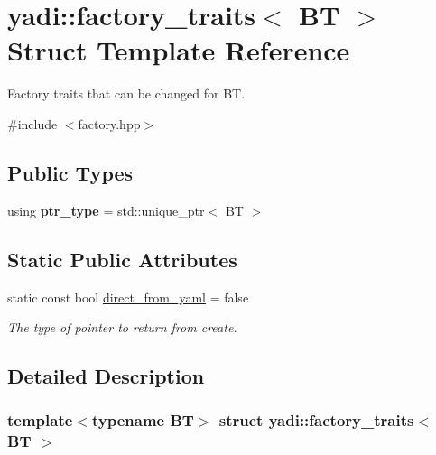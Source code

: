 \hypertarget{structyadi_1_1factory__traits}{}\section{yadi\+:\+:factory\+\_\+traits$<$ BT $>$ Struct Template Reference}
\label{structyadi_1_1factory__traits}


Factory traits that can be changed for BT.  




{\ttfamily \#include $<$factory.\+hpp$>$}

\subsection*{Public Types}
\begin{DoxyCompactItemize}
\item 
\mbox{\label{structyadi_1_1factory__traits_a9a3b539941324b3aef58464863c76b55}} 
using {\bfseries ptr\+\_\+type} = std\+::unique\+\_\+ptr$<$ BT $>$
\end{DoxyCompactItemize}
\subsection*{Static Public Attributes}
\begin{DoxyCompactItemize}
\item 
\mbox{\label{structyadi_1_1factory__traits_af63ff1e85feaa7a1215130ac4d63e308}} 
static const bool \hyperlink{structyadi_1_1factory__traits_af63ff1e85feaa7a1215130ac4d63e308}{direct\+\_\+from\+\_\+yaml} = false
\begin{DoxyCompactList}\small\item\em The type of pointer to return from create. \end{DoxyCompactList}\end{DoxyCompactItemize}


\subsection{Detailed Description}
\subsubsection*{template$<$typename BT$>$\newline
struct yadi\+::factory\+\_\+traits$<$ B\+T $>$}

